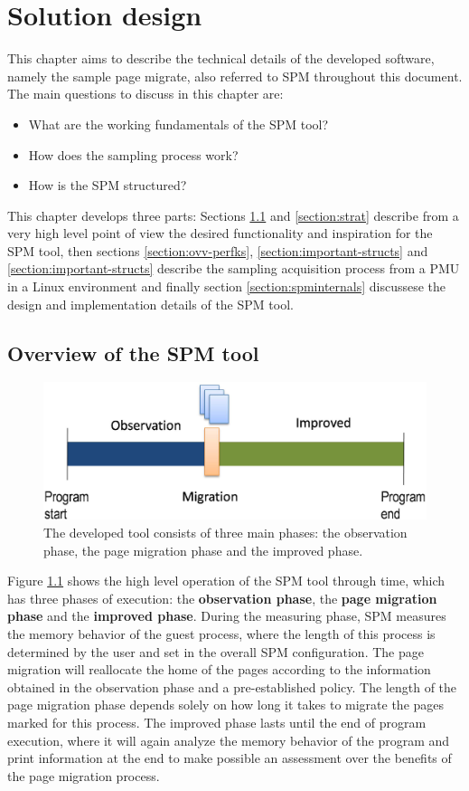 \chapter{Solution design}\label{chapter:soldesign}
This chapter aims to describe the technical details of the developed software, namely the sample page migrate, also referred to SPM throughout this document. The main questions to discuss in this chapter are:
\begin{itemize}
	\item What are the working fundamentals of the SPM tool?
	\item How does the sampling process work?
	\item How is the SPM structured?
\end{itemize}

This chapter develops three parts: Sections \ref{section:ovv-spm} and \ref{section:strat} describe from a very high level point of view the desired functionality and inspiration for the SPM tool, then sections \ref{section:ovv-perfks}, \ref{section:important-structs} and \ref{section:important-structs} describe the sampling acquisition process from a PMU in a Linux environment and finally section \ref{section:spminternals} discussese the design and implementation details of the SPM tool.


\section{Overview of the SPM tool}\label{section:ovv-spm}


\begin{figure}[ht]
	\centering
		\includegraphics[width=.6\textwidth]{figures/spm-principle.eps}
		\caption[Three phases of execution of the SPM development]{The developed tool consists of three main phases: the observation phase, the page migration phase and the improved phase.}
		\label{fig:sprinciple}
\end{figure}

Figure \ref{fig:sprinciple} shows the high level operation of the SPM tool through time, which has three phases of execution: the \textbf{observation phase}, the \textbf{page migration phase} and the \textbf{improved phase}. During the measuring phase, SPM measures the memory behavior of the guest process, where the length of this process is determined by the user and set in the overall SPM configuration. The page migration will reallocate the home of the pages according to the information obtained in the observation phase and a pre-established policy. The length of the page migration phase depends solely on how long it takes to migrate the pages marked for this process. The improved phase lasts until the end of program execution, where it will again analyze the memory behavior of the program and print information at the end to make possible an assessment over the benefits of the page migration process.

